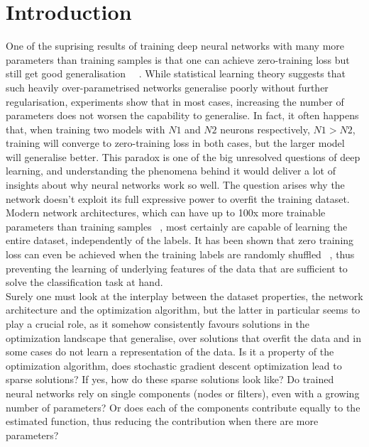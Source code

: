 \section{Introduction}
One of the suprising results of training deep neural networks with many more parameters than training samples is that one can achieve zero-training loss but still get good generalisation ~~\autocite{neyshabur2018towards}. While statistical learning theory suggests that such heavily over-parametrised networks generalise poorly without further regularisation, experiments show that in most cases, increasing the number of parameters does not worsen the capability to generalise. In fact, it often happens that, when training two models with $N1$ and $N2$ neurons respectively, $N1 > N2$, training will converge to zero-training loss in both cases, but the larger model will generalise better. This paradox is one of the big unresolved questions of deep learning, and understanding the phenomena behind it would deliver a lot of insights about why neural networks work so well. The question arises why the network doesn't exploit its full expressive power to overfit the training dataset. Modern network architectures, which can have up to 100x more trainable parameters than training samples ~\autocite{zagoruyko2016wide}, most certainly are capable of learning the entire dataset, independently of the labels. It has been shown that zero training loss can even be achieved when the training labels are randomly shuffled ~\autocite{zhang2016understanding}, thus preventing the learning of underlying features of the data that are sufficient to solve the classification task at hand. \\

Surely one must look at the interplay between the dataset properties, the network architecture and the optimization algorithm, but the latter in particular seems to play a crucial role, as it somehow consistently favours solutions in the optimization landscape that generalise, over solutions that overfit the data and in some cases do not learn a representation of the data. Is it a property of the optimization algorithm, does stochastic gradient descent optimization lead to sparse solutions? If yes, how do these sparse solutions look like? Do trained neural networks rely on single components (nodes or filters), even with a growing number of parameters? Or does each of the components contribute equally to the estimated function, thus reducing the contribution when there are more parameters? \\

